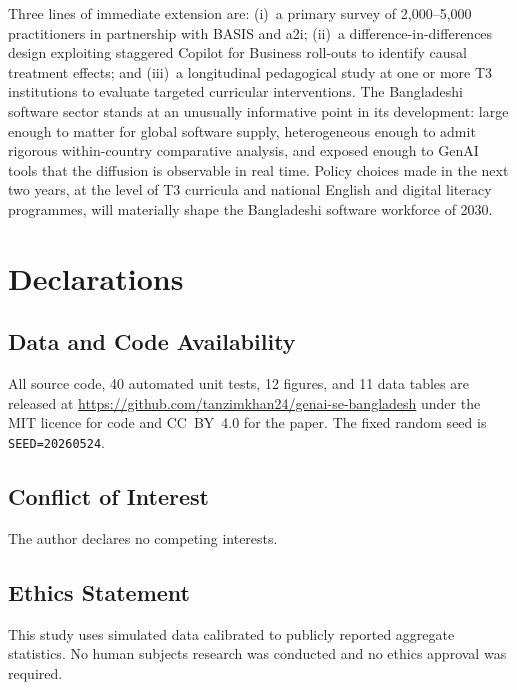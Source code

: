\documentclass[11pt,a4paper]{article}
\begin{document}
Three lines of immediate extension are: (i)~a primary survey of
2{,}000--5{,}000 practitioners in partnership with BASIS and a2i;
(ii)~a difference-in-differences design exploiting staggered Copilot
for Business roll-outs to identify causal treatment effects; and
(iii)~a longitudinal pedagogical study at one or more T3 institutions
to evaluate targeted curricular interventions. The Bangladeshi
software sector stands at an unusually informative point in its
development: large enough to matter for global software supply,
heterogeneous enough to admit rigorous within-country comparative
analysis, and exposed enough to GenAI tools that the diffusion is
observable in real time. Policy choices made in the next two years,
at the level of T3 curricula and national English and digital
literacy programmes, will materially shape the Bangladeshi software
workforce of 2030.

\section*{Declarations}

\subsection*{Data and Code Availability}

\begin{sloppypar}
All source code, 40 automated unit tests, 12 figures, and 11 data
tables are released at
\url{https://github.com/tanzimkhan24/genai-se-bangladesh} under the
MIT licence for code and CC~BY~4.0 for the paper. The fixed random
seed is \texttt{SEED=20260524}.
\end{sloppypar}

\subsection*{Conflict of Interest}
The author declares no competing interests.

\subsection*{Ethics Statement}
This study uses simulated data calibrated to publicly reported
aggregate statistics. No human subjects research was conducted and
no ethics approval was required.
\end{document}
